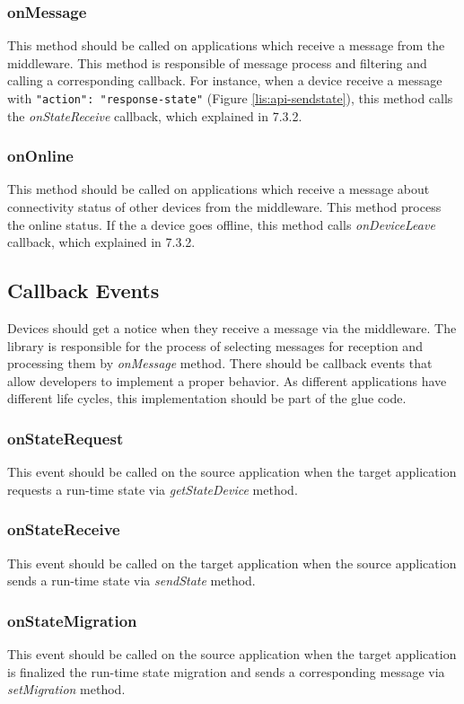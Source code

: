 \subsubsection{onMessage}
This method should be called on applications which receive a message from the middleware. This method is responsible of message process and filtering and calling a corresponding callback. For instance, when a device receive a message with \texttt{{"action": "response-state"}} (Figure \ref{lis:api-sendstate}), this method calls the \textit{onStateReceive} callback, which explained in 7.3.2.


\subsubsection{onOnline}
This method should be called on applications which receive a message about connectivity status of other devices from the middleware. This method process the online status. If the a device goes offline, this method calls \textit{onDeviceLeave} callback, which explained in 7.3.2.

\subsection{Callback Events}
Devices should get a notice when they receive a message via the middleware. The library is responsible for the process of selecting messages for reception and processing them by \textit{onMessage} method. There should be callback events that allow developers to implement a proper behavior. As different applications have different life cycles, this implementation should be part of the glue code.

\subsubsection{onStateRequest}
This event should be called on the source application when the target application requests a run-time state via \textit{getStateDevice} method.

\subsubsection{onStateReceive}
This event should be called on the target application when the source application sends a run-time state via \textit{sendState} method.

\subsubsection{onStateMigration}
This event should be called on the source application when the target application is finalized the run-time state migration and sends a corresponding message via \textit{setMigration} method.

